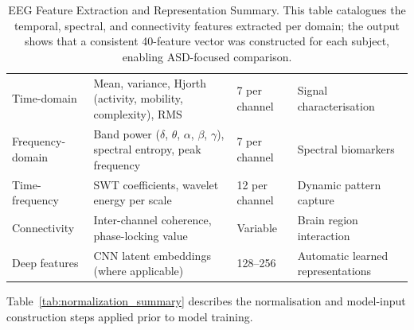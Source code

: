 {\tablestripes\tablefontsize
{}
\begin{xltabular}{\textwidth}{@{} l L l L @{}}
\caption[EEG Feature Extraction and Representation Summary]{EEG Feature Extraction and Representation Summary. This table catalogues the temporal, spectral, and connectivity features extracted per domain; the output shows that a consistent 40-feature vector was constructed for each subject, enabling ASD-focused comparison.}\label{tab:eeg_feature_extraction_summary} \\
\toprule
{} &  &  &  \\
\midrule
\endfirsthead
\endhead
\bottomrule
\endlastfoot
Time-domain & Mean, variance, Hjorth (activity, mobility, complexity), RMS & 7 per channel & Signal characterisation \\
Frequency-domain & Band power ($\delta$, $\theta$, $\alpha$, $\beta$, $\gamma$), spectral entropy, peak frequency & 7 per channel & Spectral biomarkers \\
Time-frequency & SWT coefficients, wavelet energy per scale & 12 per channel & Dynamic pattern capture \\
Connectivity & Inter-channel coherence, phase-locking value & Variable & Brain region interaction \\
Deep features & CNN latent embeddings (where applicable) & 128--256 & Automatic learned representations \\
\end{xltabular}}
\fi %

\noindent Table~\ref{tab:normalization_summary} describes the normalisation and model-input construction steps applied prior to model training.

\iffalse %

